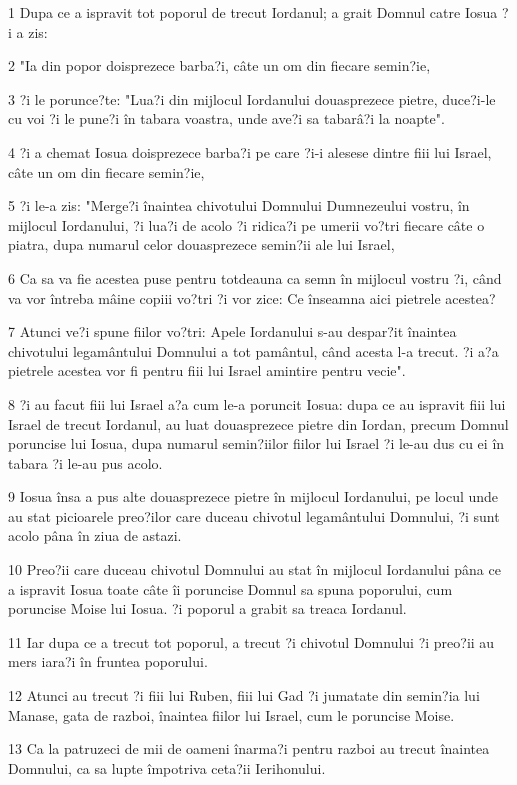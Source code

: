 \par 1 Dupa ce a ispravit tot poporul de trecut Iordanul; a grait Domnul catre Iosua ?i a zis:
\par 2 "Ia din popor doisprezece barba?i, câte un om din fiecare semin?ie,
\par 3 ?i le porunce?te: "Lua?i din mijlocul Iordanului douasprezece pietre, duce?i-le cu voi ?i le pune?i în tabara voastra, unde ave?i sa tabarâ?i la noapte".
\par 4 ?i a chemat Iosua doisprezece barba?i pe care ?i-i alesese dintre fiii lui Israel, câte un om din fiecare semin?ie,
\par 5 ?i le-a zis: "Merge?i înaintea chivotului Domnului Dumnezeului vostru, în mijlocul Iordanului, ?i lua?i de acolo ?i ridica?i pe umerii vo?tri fiecare câte o piatra, dupa numarul celor douasprezece semin?ii ale lui Israel,
\par 6 Ca sa va fie acestea puse pentru totdeauna ca semn în mijlocul vostru ?i, când va vor întreba mâine copiii vo?tri ?i vor zice: Ce înseamna aici pietrele acestea?
\par 7 Atunci ve?i spune fiilor vo?tri: Apele Iordanului s-au despar?it înaintea chivotului legamântului Domnului a tot pamântul, când acesta l-a trecut. ?i a?a pietrele acestea vor fi pentru fiii lui Israel amintire pentru vecie".
\par 8 ?i au facut fiii lui Israel a?a cum le-a poruncit Iosua: dupa ce au ispravit fiii lui Israel de trecut Iordanul, au luat douasprezece pietre din Iordan, precum Domnul poruncise lui Iosua, dupa numarul semin?iilor fiilor lui Israel ?i le-au dus cu ei în tabara ?i le-au pus acolo.
\par 9 Iosua însa a pus alte douasprezece pietre în mijlocul Iordanului, pe locul unde au stat picioarele preo?ilor care duceau chivotul legamântului Domnului, ?i sunt acolo pâna în ziua de astazi.
\par 10 Preo?ii care duceau chivotul Domnului au stat în mijlocul Iordanului pâna ce a ispravit Iosua toate câte îi poruncise Domnul sa spuna poporului, cum poruncise Moise lui Iosua. ?i poporul a grabit sa treaca Iordanul.
\par 11 Iar dupa ce a trecut tot poporul, a trecut ?i chivotul Domnului ?i preo?ii au mers iara?i în fruntea poporului.
\par 12 Atunci au trecut ?i fiii lui Ruben, fiii lui Gad ?i jumatate din semin?ia lui Manase, gata de razboi, înaintea fiilor lui Israel, cum le poruncise Moise.
\par 13 Ca la patruzeci de mii de oameni înarma?i pentru razboi au trecut înaintea Domnului, ca sa lupte împotriva ceta?ii Ierihonului.
